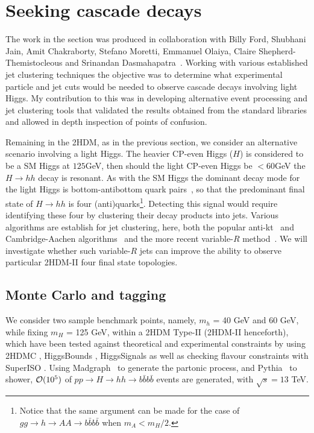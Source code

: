 \section{Seeking cascade decays}
 
The work in the section was produced in collaboration with Billy Ford, Shubhani Jain, Amit Chakraborty, Stefano Moretti, Emmanuel Olaiya, Claire Shepherd-Themistocleous and Srinandan Dasmahapatra~\cite{chakraborty2020revisiting}.
Working with various established jet clustering techniques the objective was to determine what experimental particle and jet cuts would be needed to observe cascade decays involving light Higgs.
My contribution to this was in developing alternative event processing and jet clustering tools that
validated the results obtained from the standard libraries and allowed in depth inspection of points of confusion.

Remaining in the 2HDM, as in the previous section, we consider an alternative scenario involving a light Higgs.
The heavier CP-even Higgs (\(H\)) is considered to be a SM Higgs at \(125\)GeV,
then should the light CP-even Higgs be \(< 60\)GeV the \(H\rightarrow{} hh\) decay is resonant.
As with the SM Higgs the dominant decay mode for the light Higgs is bottom-antibottom quark pairs~\cite{Moretti1994belowThreshold,Djouadi1995twoAndthree}, so that the predominant final state of \(H\rightarrow{} hh\) is four (anti)quarks\footnote{Notice that the same argument can be made for the case of $gg\to h\to AA\to b\bar b b\bar b$ when $m_A<m_H/2$.}.
Detecting this signal would require identifying these four  by clustering their decay products into jets.
Various algorithms are establish for jet clustering, here, both the popular
anti-kt~\cite{Cacciari2008akt} and Cambridge-Aachen algorithms~\cite{Wobisch1998caJet} and the
more recent variable-$R$ method~\cite{Krohn2009variableR}. 
We will investigate whether such variable-$R$ jets can improve the ability to observe particular 2HDM-II four  final state topologies. 

\subsection{Monte Carlo and tagging}

We consider two sample benchmark points, namely, $m_{h}$ = 40 GeV and 60 GeV, while  fixing $m_{H}$ = 125 GeV, within a 2HDM Type-II (2HDM-II henceforth), which have been tested against theoretical and experimental constraints by
using 2HDMC \cite{Eriksson20102HDMC}, HiggsBounds \cite{Bechtle2014higgsbounds4}, HiggsSignals \cite{Bechtle2014higgssignals} as well as checking flavour constraints with SuperISO \cite{Mahmoudi2008SuperIso}. 
Using Madgraph~\cite{alwall_madgraph2011} to generate the partonic process, and Pythia~\cite{sjostrand_pythia2015} to shower, ${\cal O}(10^5)$ of \(pp \rightarrow{} H \rightarrow{} hh \rightarrow{} b\bar{b}b\bar{b}\) events are generated, with $\sqrt{s}=13 $ TeV.

